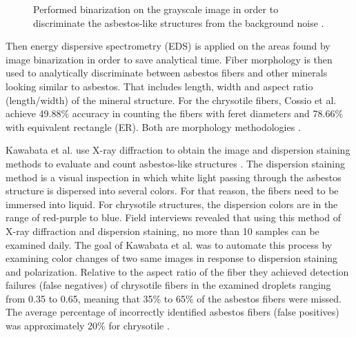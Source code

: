 \begin{figure}[h]
\centering
\caption{Performed binarization on the grayscale image in order to discriminate the asbestos-like structures from the background noise \cite{cossio2018innovative}. }
\label{fig:binarization}
\end{figure}

Then energy dispersive  spectrometry (EDS) is applied on the areas found by image binarization in order to save analytical time. Fiber morphology is then used to analytically discriminate between asbestos fibers and other minerals looking similar to asbestos. That includes length, width and aspect ratio (length/width) of the mineral structure. For the chrysotile fibers, Cossio et al. achieve 49.88\% accuracy in counting the fibers with feret diameters and 78.66\% with equivalent rectangle (ER). Both are morphology methodologies \cite{cossio2018innovative}.

Kawabata et al. use X-ray diffraction to obtain the image and dispersion staining methods to evaluate and count asbestos-like structures \cite{kawabata2009asbestos}. The dispersion staining method is a visual inspection in which white light passing through the asbestos structure is dispersed into several colors. For that reason, the fibers need to be immersed into liquid. For chrysotile structures, the dispersion colors are in the range of red-purple to blue. Field interviews revealed that using this method of X-ray diffraction and dispersion staining, no more than 10 samples can be examined daily. The goal of Kawabata et al. was to automate this process by examining color changes of two same images in response to dispersion staining and polarization. Relative to the aspect ratio of the fiber they achieved detection failures (false negatives) of chrysotile fibers in the examined droplets ranging from 0.35 to 0.65, meaning that 35\% to 65\% of the asbestos fibers were missed. The average percentage of incorrectly identified asbestos fibers (false positives) was approximately 20\% for chrysotile \cite{kawabata2009asbestos}. 

